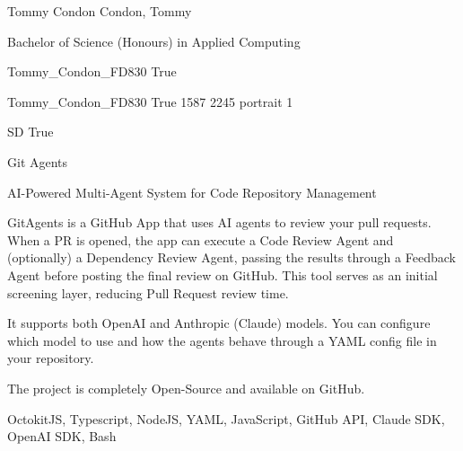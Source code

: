 \documentclass[twoside]{report}
\begin{document}
\begingroup{}\relax



\def\Key{Tommy_Condon_FD830}

{Tommy Condon}
{Condon, Tommy}

{Bachelor of Science (Honours) in Applied Computing}

{Tommy_Condon_FD830}
{True}

{Tommy_Condon_FD830}
{True}
{1587}
{2245}
{portrait}
{1}

{SD}
{True}

{Git Agents}

{AI-Powered Multi-Agent System for Code Repository Management}

{GitAgents is a GitHub App that uses AI agents to review your pull requests. When a PR is opened, the app can execute a Code Review Agent and (optionally) a Dependency Review Agent, passing the results through a Feedback Agent before posting the final review on GitHub. This tool serves as an initial screening layer, reducing Pull Request review time.

It supports both OpenAI and Anthropic (Claude) models. You can configure which model to use and how the agents behave through a YAML config file in your repository.

The project is completely Open-Source and available on GitHub.}

{OctokitJS, Typescript, NodeJS, YAML, JavaScript, GitHub API, Claude SDK, OpenAI SDK, Bash}
\end{document}
